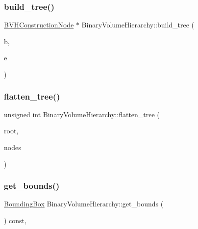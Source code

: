 \subsubsection{\texorpdfstring{build\_tree()}{build\_tree()}}
{\footnotesize\ttfamily \mbox{\hyperlink{structBVHConstructionNode}{B\+V\+H\+Construction\+Node}} $\ast$ Binary\+Volume\+Hierarchy\+::build\+\_\+tree (\begin{DoxyParamCaption}\item[{std\+::vector$<$ \mbox{\hyperlink{classBoundedVolume}{Bounded\+Volume}} $\ast$ $>$\+::iterator}]{b,  }\item[{std\+::vector$<$ \mbox{\hyperlink{classBoundedVolume}{Bounded\+Volume}} $\ast$ $>$\+::iterator}]{e }\end{DoxyParamCaption})\hspace{0.3cm}{\ttfamily [private]}}

\mbox{\label{classBinaryVolumeHierarchy_a975a30c71deb503c9f64248b8f14c8cf}} 
\subsubsection{\texorpdfstring{flatten\_tree()}{flatten\_tree()}}
{\footnotesize\ttfamily unsigned int Binary\+Volume\+Hierarchy\+::flatten\+\_\+tree (\begin{DoxyParamCaption}\item[{\mbox{\hyperlink{structBVHConstructionNode}{B\+V\+H\+Construction\+Node}} $\ast$}]{root,  }\item[{\mbox{\hyperlink{structBVHLinearNode}{B\+V\+H\+Linear\+Node}} $\ast$}]{nodes }\end{DoxyParamCaption})\hspace{0.3cm}{\ttfamily [private]}}

\mbox{\label{classBinaryVolumeHierarchy_aaec23515bc9d81ccc9115489aed8808f}} 
\subsubsection{\texorpdfstring{get\_bounds()}{get\_bounds()}}
{\footnotesize\ttfamily \mbox{\hyperlink{classBoundingBox}{Bounding\+Box}} Binary\+Volume\+Hierarchy\+::get\+\_\+bounds (\begin{DoxyParamCaption}{ }\end{DoxyParamCaption}) const\hspace{0.3cm}{\ttfamily [override]}, {\ttfamily [virtual]}}



